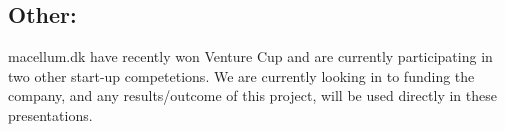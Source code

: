 \documentclass[10pt,stdletter,dateno,sigleft]{newlfm} %
\begin{document}
\begin{newlfm}
\section{Other:} macellum.dk have recently won Venture Cup and are currently participating in two other start-up competetions. We are currently looking in to funding the company, and any results/outcome of this project, will be used directly in these presentations.\\



\end{newlfm}
\end{document}
